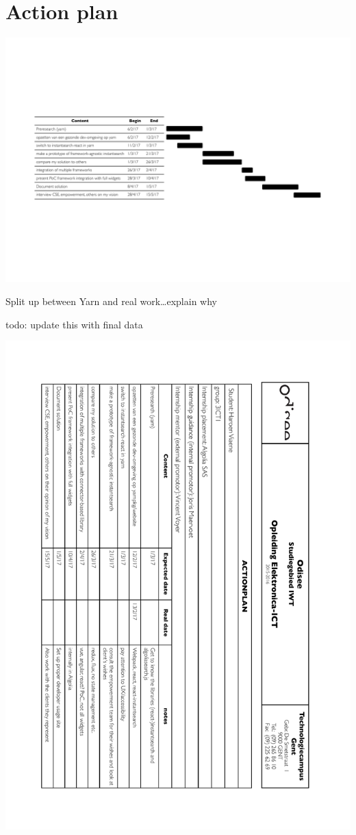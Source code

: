 
\chapter{Action plan}
\label{chp:action_plan}

\includegraphics[width=\textwidth]{../assets/action-plan-gantt.pdf}

Split up between Yarn and real work\ldots explain why

todo: update this with final data

\newpage

\includegraphics[width=\textwidth, height=0.95\textheight, keepaspectratio]{../assets/action-plan.pdf}
